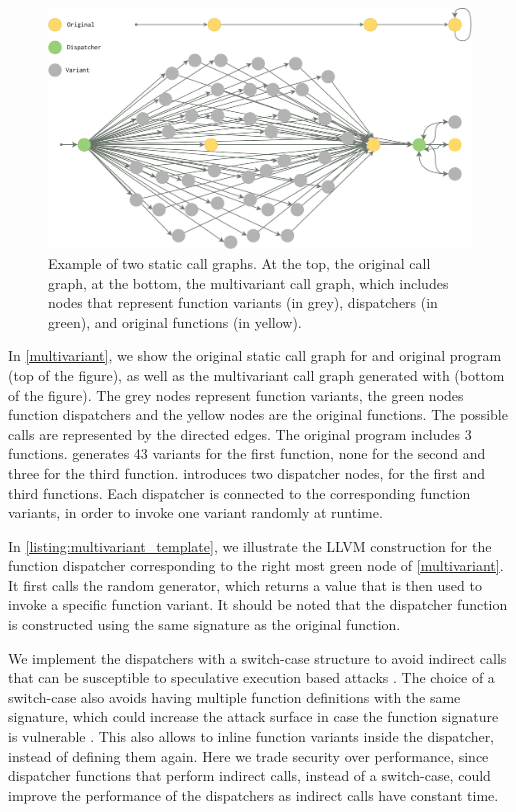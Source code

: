 \begin{figure}
    \centering
  \includegraphics[width=.9\linewidth]{diagrams/CFG.pdf}
  \caption{Example of two static call graphs. At the top, the original call graph, at the bottom, the multivariant call graph, which includes nodes that represent function variants (in grey), dispatchers (in green), and original functions  (in yellow).
}
  \label{multivariant}
\end{figure}

In \autoref{multivariant}, we show the original static call graph for and original program (top of the figure), as well as the multivariant call graph generated with \tool (bottom of the figure).
The grey nodes represent function variants, the green nodes function dispatchers and the yellow nodes are the original functions.
The possible calls are represented by the directed edges.
The original program includes 3 functions. \tool generates 43 variants for the first function, none for the second and three for the third function. 
\tool introduces two dispatcher nodes, for the first and third functions. Each dispatcher is connected to the corresponding function variants, in order to invoke one variant randomly at runtime.


In  \autoref{listing:multivariant_template}, we illustrate the LLVM construction for the function dispatcher corresponding to the right most green node of \autoref{multivariant}.
It first calls the random generator, which returns a value that is then used to invoke a specific function variant. It should be noted that the dispatcher function is constructed using the same signature as the original function. 

We implement the dispatchers with a switch-case structure to avoid indirect calls that can be susceptible to speculative execution based attacks \cite{Narayan2021Swivel}. 
The choice of a switch-case also avoids having multiple function definitions with the same signature, which could increase the attack surface in case the function signature is vulnerable \cite{johnson2021}.
This also allows \tool to inline function variants inside the dispatcher, instead of defining them again.
Here we trade security over performance, since dispatcher functions  that perform indirect calls, instead of a switch-case,  could improve the performance  of the dispatchers as indirect calls have constant time.




